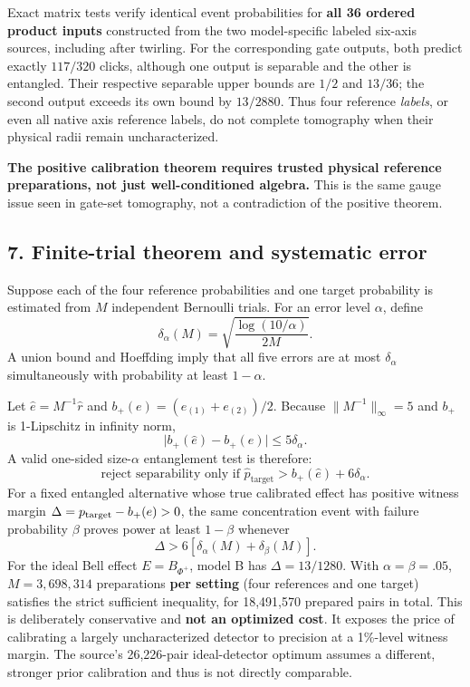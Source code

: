 \documentclass[
  10pt,
  a4paper,
]{article}
\begin{document}
Exact matrix tests verify identical event probabilities for \textbf{all 36 ordered product inputs} constructed from the two model-specific labeled six-axis sources, including after twirling. For the corresponding gate outputs, both predict exactly \(117/320\) clicks, although one output is separable and the other is entangled. Their respective separable upper bounds are \(1/2\) and \(13/36\); the second output exceeds its own bound by \(13/2880\). Thus four reference \emph{labels}, or even all native axis reference labels, do not complete tomography when their physical radii remain uncharacterized.

\textbf{The positive calibration theorem requires trusted physical reference preparations, not just well-conditioned algebra.} This is the same gauge issue seen in gate-set tomography, not a contradiction of the positive theorem.

\subsection{7. Finite-trial theorem and systematic error}\label{finite-trial-theorem-and-systematic-error}

Suppose each of the four reference probabilities and one target probability is estimated from \(M\) independent Bernoulli trials. For an error level \(\alpha\), define \[
 \delta_\alpha(M)=\sqrt{\frac{\log(10/\alpha)}{2M}}.
\] A union bound and Hoeffding imply that all five errors are at most \(\delta_\alpha\) simultaneously with probability at least \(1-\alpha\).

Let \(\widehat e=M^{-1}\widehat r\) and \(b_+(e)=(e_{(1)}+e_{(2)})/2\). Because \(\|M^{-1}\|_\infty=5\) and \(b_+\) is 1-Lipschitz in infinity norm, \[
 \big|b_+(\widehat e)-b_+(e)\big|\le5\delta_\alpha.
\] A valid one-sided size-\(\alpha\) entanglement test is therefore: \[
 \boxed{\text{reject separability only if }\widehat p_{\mathrm{target}}>b_+(\widehat e)+6\delta_\alpha.}
\] For a fixed entangled alternative whose true calibrated effect has positive witness margin \(\Delta=p_{\rm target}-b_+(e)>0\), the same concentration event with failure probability \(\beta\) proves power at least \(1-\beta\) whenever \[
 \Delta>6[\delta_\alpha(M)+\delta_\beta(M)].
\] For the ideal Bell effect \(E=B_{\Phi^+}\), model B has \(\Delta=13/1280\). With \(\alpha=\beta=.05\), \(M=3,698,314\) preparations \textbf{per setting} (four references and one target) satisfies the strict sufficient inequality, for 18,491,570 prepared pairs in total. This is deliberately conservative and \textbf{not an optimized cost}. It exposes the price of calibrating a largely uncharacterized detector to precision at a 1\%-level witness margin. The source's 26,226-pair ideal-detector optimum assumes a different, stronger prior calibration and thus is not directly comparable.
\end{document}
